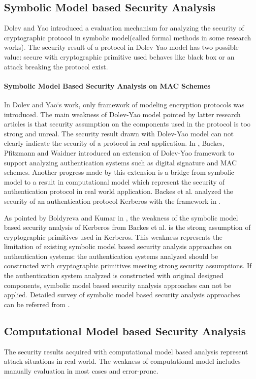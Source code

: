 \documentclass{article}
\begin{document}
\subsection{Symbolic Model based Security Analysis}
Dolev and Yao introduced \cite{dolev-yao} a evaluation mechanism for analyzing the security of cryptographic protocol in
symbolic model(called formal methods in some research works). The security result of a protocol in
Dolev-Yao model has two possible value: secure with cryptographic primitive used
behaves like black box or an attack breaking the protocol exist.  
\paragraph{Symbolic Model Based Security Analysis on MAC Schemes}
In Dolev and Yao`s work, only framework of modeling encryption protocols was
introduced. The main weakness of Dolev-Yao model pointed by latter research
articles is that security assumption on the components used in the protocol is
too strong and unreal. The security result drawn with Dolev-Yao model can not
clearly indicate the security of a protocol in real application. In
\cite{symbolic-mac},
Backes, Pfitzmann and Waidner introduced an extension of Dolev-Yao framework to
support analyzing authentication systems such as digital signature and MAC
schemes. Another progress made by this extension is a bridge from symbolic model
to a result in computational model which represent the security of
authentication protocol in real world application.  Backes et al. analyzed the security of an authentication protocol
Kerberos with the framework in \cite{symbolic-kerberos}.

As pointed by Boldyreva and Kumar in \cite{computational-kerberos}, the weakness of the symbolic model based security
analysis of Kerberos from Backes et al. is the strong assumption of
cryptographic primitives used in Kerberos. This weakness represents the limitation
of existing symbolic model based security analysis approaches on authentication
systems: the authentication systems analyzed should be constructed with
cryptographic primitives meeting strong security assumptions. If the
authentication system analyzed is constructed with original designed components,
symbolic model based security analysis approaches can not be applied. 
Detailed survey of symbolic model based security analysis approaches can be
referred from \cite{symbolic-survey}.

\subsection{Computational Model based Security Analysis}
The security
results acquired with computational model based analysis represent attack situations in real world. The weakness of computational model includes manually evaluation in most cases and error-prone. 
\end{document}
